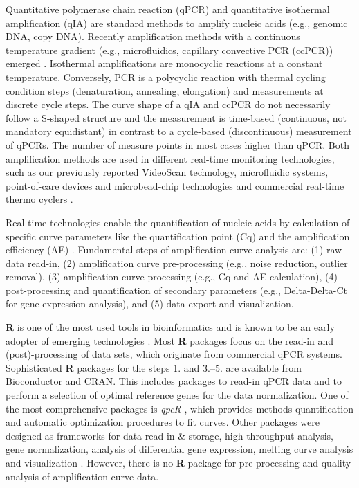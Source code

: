 \documentclass[twocolumn]{bmcart}%
\begin{document}
Quantitative polymerase chain reaction (qPCR) and quantitative isothermal 
amplification (qIA) are standard methods to amplify nucleic acids (e.g., genomic 
DNA, copy DNA). Recently amplification methods with a continuous temperature 
gradient (e.g., microfluidics, capillary convective PCR (ccPCR)) emerged 
\cite{bustin_miqe_2009, rodiger_nucleic_2014, chou_rapid_2011}. Isothermal 
amplifications are monocyclic reactions at a constant temperature. Conversely, 
PCR is a polycyclic reaction with thermal cycling condition steps (denaturation, 
annealing, elongation) and measurements at discrete cycle steps. The curve shape 
of a qIA and ccPCR do not necessarily follow a S-shaped structure and the 
measurement is time-based (continuous, not mandatory equidistant) in contrast to 
a cycle-based (discontinuous) measurement of qPCRs. The number of measure points 
in most cases higher than qPCR. Both amplification methods are used in different 
real-time monitoring technologies, such as our previously reported VideoScan 
technology, microfluidic systems, point-of-care devices and microbead-chip 
technologies and commercial real-time thermo cyclers 
\cite{rodiger_nucleic_2014,chang_2012, roediger_highly_2013, 
roediger_bead_qPCR_2013}.

Real-time technologies enable the quantification of nucleic acids by calculation 
of specific curve parameters like the quantification point (Cq) and the 
amplification efficiency (AE) \cite{ruijter_2013,tellinghuisen_2014}. 
Fundamental steps of amplification curve analysis are: (1) raw data read-in, (2) 
amplification curve pre-processing (e.g., noise reduction, outlier removal), (3) 
amplification curve processing (e.g., Cq and AE calculation), (4) 
post-processing and quantification of secondary parameters (e.g., Delta-Delta-Ct 
for gene expression analysis), and (5) data export and visualization.

  \textbf{R} is one of the most used tools in bioinformatics and is known to be 
an early adopter of emerging technologies \cite{pabinger_2014}. Most \textbf{R} 
packages focus on the read-in and (post)-processing of data sets, which 
originate from commercial qPCR systems. Sophisticated \textbf{R} packages for 
the steps 1. and 3.--5. are available from Bioconductor and CRAN. This includes 
packages to read-in qPCR data and to perform a selection of optimal reference 
genes for the data normalization. One of the most comprehensive packages is 
\emph{qpcR} \cite{ritz_2008}, which provides methods quantification and 
automatic optimization procedures to fit curves. Other packages were designed as 
frameworks for data read-in \& storage, high-throughput analysis, gene 
normalization, analysis of differential gene expression, melting curve analysis 
and visualization 
\cite{Dvinge_2009,perkins_2012,blagodatskikh_2014,heckmann_2011,pan_2012, 
Zhang_2010,mccall_2014,roediger_RJ_2013}. However, there is no \textbf{R} 
package for pre-processing and quality analysis of amplification curve data.
\end{document}
